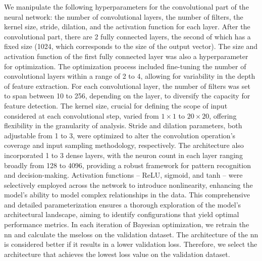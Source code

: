 We manipulate the following hyperparameters for the convolutional part of the neural network: the number of convolutional layers, the number of filters, the kernel size, stride, dilation, and the activation function for each layer. After the convolutional part, there are 2 fully connected layers, the second of which has a fixed size (1024, which corresponds to the size of the output vector). The size and activation function of the first fully connected layer was also a hyperparameter for optimization.
The optimization process included fine-tuning the number of convolutional layers within a range of 2 to 4, allowing for variability in the depth of feature extraction. For each convolutional layer, the number of filters was set to span between 10 to 256, depending on the layer, to diversify the capacity for feature detection. The kernel size, crucial for defining the scope of input considered at each convolutional step, varied from $1 \times 1$ to $20 \times 20$, offering flexibility in the granularity of analysis. Stride and dilation parameters, both adjustable from 1 to 3, were optimized to alter the convolution operation's coverage and input sampling methodology, respectively. The architecture also incorporated 1 to 3 dense layers, with the neuron count in each layer ranging broadly from 128 to 4096, providing a robust framework for pattern recognition and decision-making. Activation functions -- ReLU, sigmoid, and tanh -- were selectively employed across the network to introduce nonlinearity, enhancing the model's ability to model complex relationships in the data. This comprehensive and detailed parameterization ensures a thorough exploration of the model's architectural landscape, aiming to identify configurations that yield optimal performance metrics. In each iteration of Bayesian optimization, we retrain the \acrshort{nn} and calculate the \acrshort{mse}loss on the validation dataset. The architecture of the \acrshort{nn} is considered better if it results in a lower validation loss. Therefore, we select the architecture that achieves the lowest loss value on the validation dataset.

